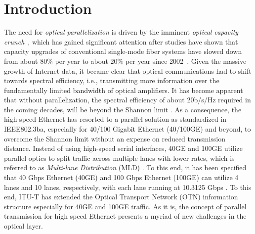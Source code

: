 \documentclass[conference]{IEEEtran}
\begin{document}
\section{Introduction}     
\par The need for \emph{optical parallelization} is driven by the imminent \emph{optical capacity crunch}~\cite{Chralyvy:ecoc:2009}, which has gained significant attention after studies have shown that capacity upgrades of conventional single-mode fiber systems have slowed down from about $80\%$ per year to about $20\%$ per year since 2002~\cite{Chralyvy:ecoc:2009}\cite{Winzer:2012}.  Given the massive growth of Internet data, it became clear that optical communications had to shift towards spectral efficiency, i.e., transmitting more information over the fundamentally limited bandwidth of optical amplifiers. It has become apparent that without parallelization, the spectral efficiency of about 20b/s/Hz required in the coming decades, will be beyond the Shannon limit \cite{Winzer:2012}. As a consequence, the high-speed Ethernet has resorted to a parallel solution as standardized in IEEE802.3ba,  especially for 40/100 Gigabit Ethernet (40/100GE) and beyond, to overcome the Shannon limit without 
an expense on reduced transmission distance. Instead of using  high-speed serial interfaces, 40GE and 100GE   utilize 
parallel optics to split traffic across multiple lanes with lower rates, which is referred to as \emph{Multi-lane 
Distribution} (MLD) \cite{802.3ba}. To this end, it has been specified that 40 Gbps Ethernet (40GE) and 100 Gbps 
Ethernet (100GE) can utilize 4 lanes and 10 lanes,  respectively, with each lane running at 10.3125 Gbps 
\cite{802.3ba}. To this end,  ITU-T has extended the Optical Transport Network (OTN) information structure especially 
for 40GE and 100GE traffic.  As it is, the concept of parallel transmission for high speed Ethernet presents  a myriad of 
new challenges in the optical layer. 
\end{document}
